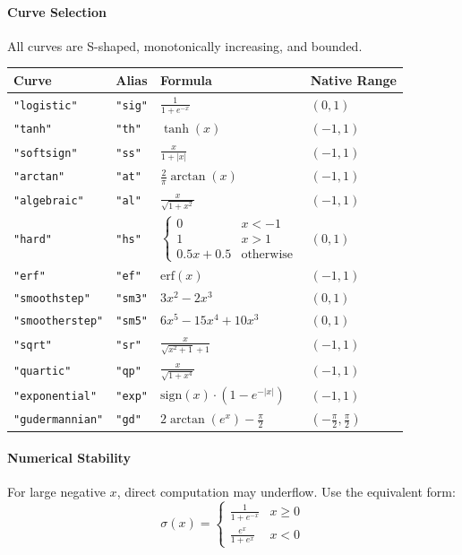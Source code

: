 \paragraph{Curve Selection}
All curves are S-shaped, monotonically increasing, and bounded.
\begin{center}
\renewcommand{\arraystretch}{1.5}
\begin{tabular}{llll}
\textbf{Curve} & \textbf{Alias} & \textbf{Formula} & \textbf{Native Range} \\ \hline
\texttt{"logistic"} & \texttt{"sig"} & $\frac{1}{1 + e^{-x}}$ & $(0, 1)$ \\
\texttt{"tanh"} & \texttt{"th"} & $\tanh(x)$ & $(-1, 1)$ \\
\texttt{"softsign"} & \texttt{"ss"} & $\frac{x}{1 + |x|}$ & $(-1, 1)$ \\
\texttt{"arctan"} & \texttt{"at"} & $\frac{2}{\pi} \arctan(x)$ & $(-1, 1)$ \\
\texttt{"algebraic"} & \texttt{"al"} & $\frac{x}{\sqrt{1 + x^2}}$ & $(-1, 1)$ \\
\texttt{"hard"} & \texttt{"hs"} & $\begin{cases} 0 & x < -1 \\ 1 & x > 1 \\ 0.5x + 0.5 & \text{otherwise} \end{cases}$ & $(0, 1)$ \\
\texttt{"erf"} & \texttt{"ef"} & $\text{erf}(x)$ & $(-1, 1)$ \\
\texttt{"smoothstep"} & \texttt{"sm3"} & $3x^2 - 2x^3$ & $(0, 1)$ \\
\texttt{"smootherstep"} & \texttt{"sm5"} & $6x^5 - 15x^4 + 10x^3$ & $(0, 1)$ \\
\texttt{"sqrt"} & \texttt{"sr"} & $\frac{x}{\sqrt{x^2+1}+1}$ & $(-1, 1)$ \\
\texttt{"quartic"} & \texttt{"qp"} & $\frac{x}{\sqrt{1+x^4}}$ & $(-1, 1)$ \\
\texttt{"exponential"} & \texttt{"exp"} & $\text{sign}(x) \cdot (1 - e^{-|x|})$ & $(-1, 1)$ \\
\texttt{"gudermannian"} & \texttt{"gd"} & $2 \arctan(e^x) - \frac{\pi}{2}$ & $(-\frac{\pi}{2}, \frac{\pi}{2})$ \\
\end{tabular}
\end{center}

\paragraph{Numerical Stability}
For large negative $x$, direct computation may underflow. Use the equivalent form:
\[
\sigma(x) = \begin{cases} \frac{1}{1 + e^{-x}} & x \geq 0 \\ \frac{e^x}{1 + e^x} & x < 0 \end{cases}
\]

